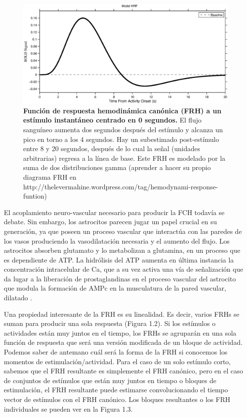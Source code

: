 \documentclass[12pt,a5,twoside]{book}
\begin{document}
\begin{figure}
	\centering
	\includegraphics [scale=0.6,center] {HRF.eps}
    \caption{\textbf{Función de respuesta hemodinámica canónica (FRH) a un estímulo instantáneo centrado en 0 segundos.} El flujo sanguíneo aumenta dos segundos después del estímulo y alcanza un pico en torno a los 4 segundos. Hay un subestimado post-estímulo entre 8 y 20 segundos, después de lo cual la señal (unidades arbitrarias) regresa a la línea de base. Este FRH es modelado por la suma de dos distribuciones gamma (aprender a hacer su propio diagrama FRH en http://thelevermahine.wordpress.com/tag/hemodynami-response-funtion)}
    \label{F:HRF}
\end{figure}

El acoplamiento neuro-vascular necesario para producir la FCH todavía se debate. Sin embargo, los astrocitos parecen jugar un papel crucial en su generación, ya que poseen un proceso vascular que interactúa con las paredes de los vasos produciendo la vasodilatación necesaria y el aumento del flujo. Los astrocitos absorben glutamato y lo metabolizan a glutamina, en un proceso que es dependiente de ATP. La hidrólisis del ATP aumenta en última instancia la concentración intracelular de Ca, que a su vez activa una vía de señalización que da lugar a la liberación de prostaglandinas en el proceso vascular del astrocito que modula la formación de AMPc en la musculatura de la pared vascular, dilatado \citep{KoehlerRC2009}.

Una propiedad interesante de la FRH es su linealidad. Es decir, varios FRHs se suman para producir una sola respuesta (Figura 1.2). Si los estímulos o actividades están muy juntos en el tiempo, los FRHs se agruparán en una sola función de respuesta que será una versión modificada de un bloque de actividad. Podemos saber de antemano cuál será la forma de la FRH si conocemos los momentos de estimulación/actividad. Para el caso de un solo estímulo corto, sabemos que el FRH resultante es simplemente el FRH canónico, pero en el caso de conjuntos de estímulos que están muy juntos en tiempo o bloques de estimulación, el FRH resultante puede estimarse convolucionando el tiempo vector de estímulos con el FRH canónico. Los bloques resultantes o los FRH individuales se pueden ver en la Figura 1.3.
\end{document}
